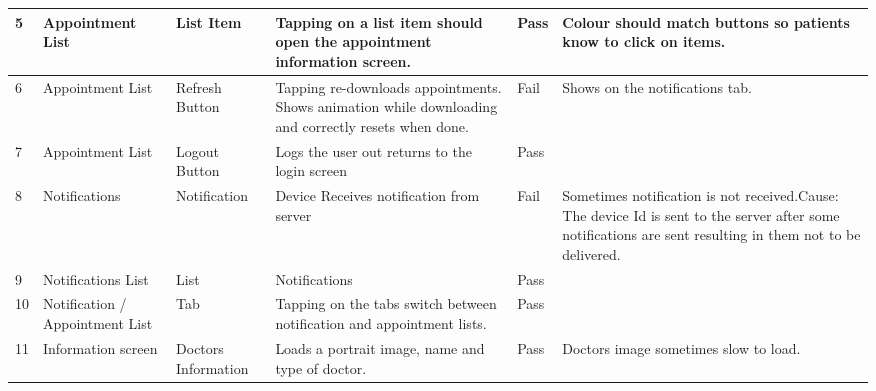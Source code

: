 \begin{table}[h]
{\begin{tabular}{|m{1cm}|m{3cm}|m{4cm}|m{6cm}|m{2cm}|m{6cm}|}
5       & Appointment List              & List Item                    & Tapping on a list item should open the appointment information screen.                                                    & Pass        & Colour should match buttons so patients know to click on items.                                                                                            \\ \hline
6       & Appointment List              & Refresh Button               & Tapping re-downloads appointments. Shows animation while downloading and correctly resets when done.                      & Fail        & Shows on the notifications tab.                                                                                                                            \\ \hline
7       & Appointment List              & Logout Button                & Logs the user out returns to the login screen                                                                             & Pass        &                                                                                                                                                            \\ \hline
8       & Notifications                 & Notification                 & Device Receives notification from server                                                                                  & Fail        & Sometimes notification is not received.Cause: The device Id is sent to the server after some notifications are sent resulting in them not to be delivered. \\ \hline
9       & Notifications List            & List                         & Notifications                                                                                                             & Pass        &                                                                                                                                                            \\ \hline
10      & Notification / Appointment List & Tab                          & Tapping on the tabs switch between notification and appointment lists.                                                    & Pass        &                                                                                                                                                            \\ \hline
11      & Information screen            & Doctors Information          & Loads a portrait image, name and type of doctor.                                                                          & Pass        & Doctors image sometimes slow to load.                                                                                                                      \\ \hline

\end{tabular}}
\end{table}
